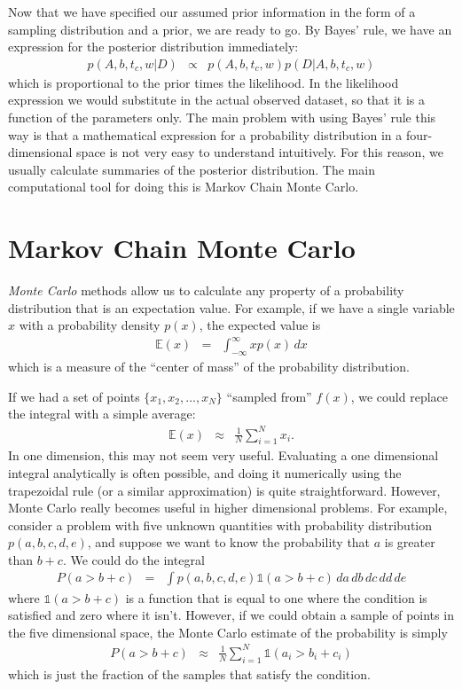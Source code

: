 Now that we have specified our assumed prior information in the form of a
sampling distribution and a prior, we are ready to go. By Bayes' rule, we
have an expression for the posterior distribution immediately:
\begin{eqnarray}
p(A, b, t_c, w | D) &\propto& p(A, b, t_c, w)p(D | A, b, t_c, w)
\end{eqnarray}
which is proportional to the prior times the likelihood. In the likelihood
expression we would substitute in the actual observed dataset, so that it is
a function of the parameters only.
The main problem with using Bayes' rule this way is that a mathematical
expression for a probability distribution in a four-dimensional space is not
very easy to understand intuitively. For this reason, we usually calculate
summaries of the posterior distribution. The main computational tool for doing
this is Markov Chain Monte Carlo.

\section{Markov Chain Monte Carlo}
{\it Monte Carlo} methods allow us to calculate any property of a probability
distribution that is an expectation value. For example, if we have a
single variable
$x$ with a probability density $p(x)$, the expected value is
\begin{eqnarray}
\mathds{E}(x) &=& \int_{-\infty}^{\infty} x p(x) \, dx 
\end{eqnarray}
which is a measure of the ``center of mass'' of the probability distribution.

If we had a set of points $\{x_1, x_2, ..., x_N\}$ ``sampled from'' $f(x)$,
we could replace the integral with a simple average:
\begin{eqnarray}
\mathds{E}(x) &\approx& \frac{1}{N} \sum_{i=1}^N x_i.
\end{eqnarray}
In one dimension, this may not seem very useful. Evaluating a one dimensional
integral analytically is often possible, and doing it numerically using the
trapezoidal rule (or a similar approximation) is quite straightforward.
However, Monte Carlo really becomes useful in higher dimensional problems.
For example, consider a problem with five unknown quantities with probability
distribution $p(a, b, c, d, e)$, and suppose we want to know the probability
that $a$ is greater than $b + c$. We could do the integral
\begin{eqnarray}
P(a > b + c) &=& \int p(a, b, c, d, e) \mathds{1}\left(a > b + c\right) \, da \, db \, dc \,dd \,de 
\end{eqnarray}
where $\mathds{1}\left(a > b + c\right)$ is a function that is equal to one
where the condition is satisfied and zero where it isn't. However, if we could
obtain a sample of points in the five dimensional space, the Monte Carlo
estimate of the probability is simply
\begin{eqnarray}
P(a > b + c) &\approx& \frac{1}{N}\sum_{i=1}^N \mathds{1}\left(a_i > b_i + c_i\right)
\end{eqnarray}
which is just the fraction of the samples that satisfy the condition.

